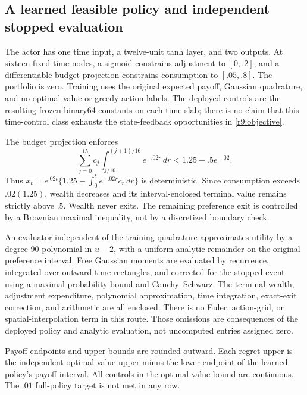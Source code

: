 \subsection{A learned feasible policy and independent stopped evaluation}\label{r9:policy}
The actor has one time input, a twelve-unit tanh layer, and two outputs. At sixteen fixed time nodes, a sigmoid constrains adjustment to $[0,.2]$, and a differentiable budget projection constrains consumption to $[.05,.8]$. The portfolio is zero. Training uses the original expected payoff, Gaussian quadrature, and no optimal-value or greedy-action labels. The deployed controls are the resulting frozen binary64 constants on each time slab; there is no claim that this time-control class exhausts the state-feedback opportunities in \eqref{r9:objective}.

The budget projection enforces
\begin{equation}
 \sum_{j=0}^{15}c_j\int_{j/16}^{(j+1)/16}e^{-.02r}\,dr
 <1.25-.5e^{-.02}.\label{r9:budgetprojection}
\end{equation}
Thus $x_t=e^{.02t}\{1.25-\int_0^te^{-.02r}c_r\,dr\}$ is deterministic. Since consumption exceeds $.02(1.25)$, wealth decreases and its interval-enclosed terminal value remains strictly above $.5$. Wealth never exits. The remaining preference exit is controlled by a Brownian maximal inequality, not by a discretized boundary check.

An evaluator independent of the training quadrature approximates utility by a degree-90 polynomial in $u-2$, with a uniform analytic remainder on the original preference interval. Free Gaussian moments are evaluated by recurrence, integrated over outward time rectangles, and corrected for the stopped event using a maximal probability bound and Cauchy--Schwarz. The terminal wealth, adjustment expenditure, polynomial approximation, time integration, exact-exit correction, and arithmetic are all enclosed. There is no Euler, action-grid, or spatial-interpolation term in this route. Those omissions are consequences of the deployed policy and analytic evaluation, not uncomputed entries assigned zero.

\begin{table}[t]
\centering\small
\caption{Original-payoff continuous certificates at the central state}\label{r9:tab:original}

\par\smallskip\footnotesize Payoff endpoints and upper bounds are rounded outward. Each regret upper is the independent optimal-value upper minus the lower endpoint of the learned policy's payoff interval. All controls in the optimal-value bound are continuous. The $.01$ full-policy target is not met in any row.
\end{table}

